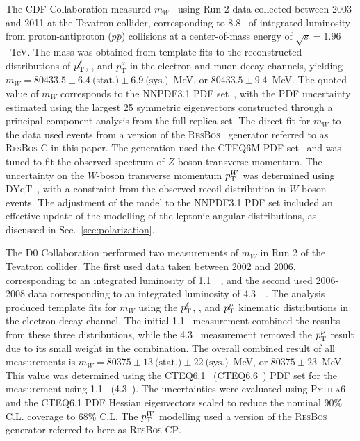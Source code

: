 The CDF Collaboration measured $m_W$~\cite{CDF:2022hxs} using Run 2 data collected between 2003 and 2011 at the Tevatron
collider, corresponding to 8.8~\ifb{} of integrated luminosity from proton-antiproton ($p\bar{p}$) collisions at a
center-of-mass energy of $\sqrt{s}=1.96$~TeV.  The mass was obtained from template fits to the reconstructed
distributions of $p^{\ell}_{\scriptsize\mathrm{T}}$, \mT, and $p^{\nu}_{\mathrm T}$ in the 
electron and muon decay channels, yielding $m_W=80433.5\pm 6.4~\textrm{(stat.)} \pm 6.9~\textrm{(sys.)}$~MeV, or
$80433.5\pm 9.4$~MeV.  
The quoted value of $m_W$ corresponds to the NNPDF3.1 PDF set~\cite{Ball:2017nwa}, with the PDF uncertainty estimated using 
the largest 25 symmetric eigenvectors constructed through a principal-component analysis from the full replica
set.  The direct fit for $m_W$ to the data used events from a version of the {\textsc{ResBos}}~\cite{Ladinsky:1993zn}
generator referred to as {\textsc{ResBos-C}} in this paper.  The generation used the CTEQ6M PDF set~\cite{Pumplin:2002vw} 
and was tuned to fit the observed spectrum of $Z$-boson transverse momentum.  The uncertainty on the $W$-boson transverse 
momentum $p_{\scriptsize\textrm{T}}^{W}$ was determined using DYqT~\cite{Bozzi:2008bb,Bozzi:2010xn}, with a constraint from
the observed recoil
distribution in $W$-boson events.  The adjustment of the model to the NNPDF3.1 PDF set included an effective update of
the modelling of the leptonic angular distributions, as discussed in Sec.~\ref{sec:polarization}.

The D0 Collaboration performed two measurements of $m_W$ in Run 2 of the Tevatron collider.  The first used data taken
between 2002 and 2006, corresponding to an integrated luminosity of 1.1~\ifb{}~\cite{Abazov:2009cp}, and the second
used 2006-2008 data corresponding to an integrated luminosity of 4.3~\ifb{}~\cite{D0:2013jba}.  The analysis 
produced template fits for $m_W$ using the $p^{\ell}_{\scriptsize\textrm{T}}$, \mT, and $p^{\nu}_{\scriptsize\textrm{T}}$
kinematic distributions in the electron decay channel.  The initial 1.1~\ifb{} measurement combined the results from these
three distributions, while the 4.3~\ifb{} measurement removed the $p^{\nu}_{\scriptsize\textrm{T}}$ result due to its small
weight in the combination.  The overall combined result of all measurements is
$m_W = 80375\pm13~\textrm{(stat.)}\pm22~\textrm{(sys.)}$~MeV, or $80375\pm23$~MeV.  This value was determined using the
CTEQ6.1~\cite{Stump:2003yu} (CTEQ6.6~\cite{Nadolsky:2008zw}) PDF set for the measurement using 1.1~\ifb{} (4.3~\ifb{}).
The uncertainties were evaluated using {\textsc{Pythia6}}~\cite{Sjostrand:2006za} and the CTEQ6.1 PDF Hessian eigenvectors
scaled to reduce the nominal 90\% C.L. coverage to 68\% C.L.  The $p_{\scriptsize\textrm{T}}^{W}$ modelling used a version of
the {\textsc{ResBos}}~\cite{Balazs:1997xd,Landry:2002ix} generator referred to here as {\textsc{ResBos-CP}}.  

